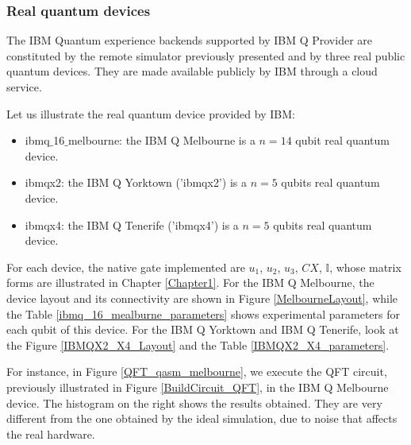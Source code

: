 \subsubsection{Real quantum devices}
The IBM Quantum experience backends supported by IBM Q Provider are constituted by the remote simulator previously presented and by three real public quantum devices. They are made available publicly by IBM through a cloud service. 

\noindent Let us illustrate the real quantum device provided by IBM:

\begin{itemize}
	\item {\selectfont ibmq$\_$16$\_$melbourne}: the IBM Q Melbourne is a $n=14$ qubit real quantum device. 
	\item {\selectfont ibmqx2}: the IBM Q Yorktown ('ibmqx2') is a $n=5$ qubits real quantum device. 
	\item {\selectfont ibmqx4}: the IBM Q Tenerife ('ibmqx4') is a $n=5$ qubits real quantum device. 

\end{itemize}

\noindent For each device, the native gate implemented are $u_1$, $u_2$, $u_3$, $CX$, $\mathbb{I}$, whose matrix forms are illustrated in Chapter \ref{Chapter1}. For the IBM Q Melbourne, the device layout and its connectivity are shown in Figure \ref{MelbourneLayout}, while the Table \ref{ibmq_16_mealburne_parameters} shows experimental parameters for each qubit of this device. For the IBM Q Yorktown and 
IBM Q Tenerife, look at the Figure \ref{IBMQX2_X4_Layout} and the Table \ref{IBMQX2_X4_parameters}.

For instance, in Figure \ref{QFT_qasm_melbourne}, we execute the QFT circuit, previously illustrated in Figure \ref{BuildCircuit_QFT}, in the IBM Q Melbourne device. The histogram on the right shows the results obtained. They are very different from the one obtained by the ideal simulation, due to noise that affects the real hardware.

